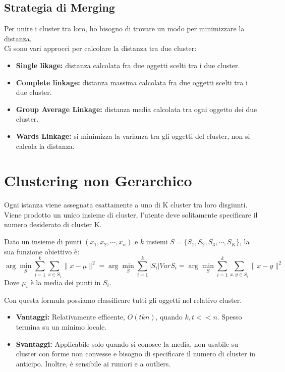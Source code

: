\subsection{Strategia di Merging}
Per unire i cluster tra loro, ho bisogno di trovare un modo per minimizzare la distanza. \\
Ci sono vari approcci per calcolare la distanza tra due cluster:
\begin{itemize}
  \item \textbf{Single likage:} distanza calcolata fra due oggetti scelti tra i due cluster.
  \item \textbf{Complete linkage:} distanza massima calcolata fra due oggetti scelti tra i due cluster.
  \item \textbf{Group Average Linkage:} distanza media calcolata tra ogni oggetto dei due cluster.
  \item \textbf{Wards Linkage:} si minimizza la varianza tra gli oggetti del cluster, non si calcola la distanza.
\end{itemize}

\section{Clustering non Gerarchico}
Ogni istanza viene assegnata esattamente a uno di K cluster tra loro disgiunti.\\ 
Viene prodotto un unico insieme di cluster, l'utente deve solitamente specificare il numero desiderato di cluster K.

\begin{defn}
  Dato un insieme di punti $(x_1, x_2, \cdots, x_n)$ e $k$ insiemi $S = \{S_1, S_2, S_3, \cdots, S_K\}$, la sua funzione obiettivo è:
  \[
    \arg\min_S \sum_{i=1}^k \sum_{x \in S_i} \|x - \mu\|^2 = \arg\min_S \sum_{i=1}^k |S_i| Var S_i = \arg\min_S \sum_{i=1}^k \sum_{x,y \in S_i} \|x - y\|^2
  \]
  Dove $\mu_i$ è la media dei punti in $S_i$.
\end{defn}
Con questa formula possiamo classificare tutti gli oggetti nel relativo cluster.

\begin{note}
  \begin{itemize}
    \item \textbf{Vantaggi:} Relativamente efficente, $O(tkn)$, quando $k,t << n$. Spesso termina su un minimo locale.
    \item \textbf{Svantaggi:} Applicabile solo quando si conosce la media, non usabile su cluster con forme non convesse e bisogno di specificare il numero di cluster in anticipo. 
      Inoltre, è sensibile ai rumori e a outliers.
  \end{itemize}
\end{note}


